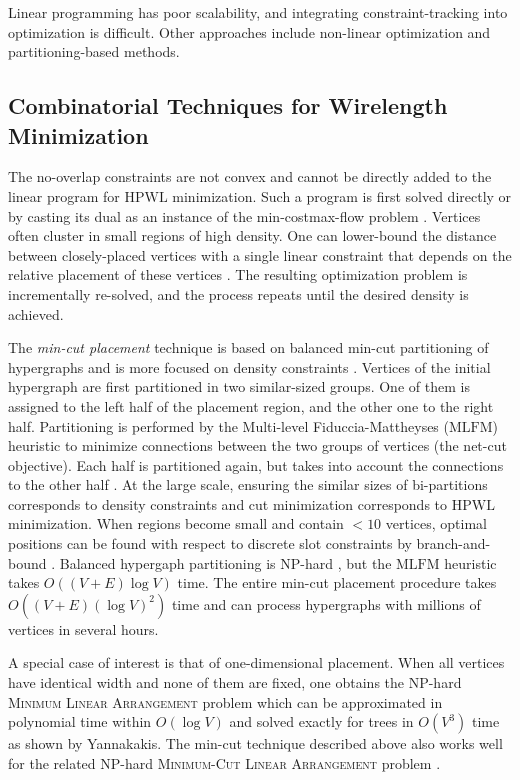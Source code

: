 \documentclass[natbib]{svcyclop}
\begin{document}
Linear programming has poor scalability, and integrating
constraint-tracking into optimization is difficult.
Other approaches include non-linear optimization and
partitioning-based methods.

\subsection{Combinatorial Techniques
for Wirelength Minimization}
The no-overlap constraints are not convex and cannot be
directly added to the linear program for $\mathrm{HPWL}$ minimization.
Such a program is first solved directly or by casting its
dual as an instance of the min-costmax-flow problem \cite{TanTiaWon05}.
Vertices often cluster in small regions of high density. One
can lower-bound the distance between closely-placed vertices
with a single linear constraint that depends on the relative
placement of these vertices \cite{RedCho06}. The resulting optimization
problem is incrementally re-solved, and the process
repeats until the desired density is achieved.

The \emph{min-cut placement} technique is based on balanced
min-cut partitioning of hypergraphs and is more focused
on density constraints \cite{RoyAdyPapMar06}. Vertices of the initial hypergraph
are first partitioned in two similar-sized groups. One
of them is assigned to the left half of the placement region,
and the other one to the right half. Partitioning is performed
by the Multi-level Fiduccia-Mattheyses ($\mathrm{MLFM}$)
heuristic \cite{PapMar07} to minimize connections between the two
groups of vertices (the net-cut objective). Each half is partitioned
again, but takes into account the connections to
the other half \cite{RoyAdyPapMar06}. At the large scale, ensuring the similar
sizes of bi-partitions corresponds to density constraints
and cut minimization corresponds to $\mathrm{HPWL}$ minimization.
When regions become small and contain $< 10$ vertices,
optimal positions can be found with respect to discrete
slot constraints by branch-and-bound \cite{CalKahMar00}. Balanced
hypergaph partitioning is NP-hard \cite{CGKMSP98}, but the $\mathrm{MLFM}$
heuristic takes $O((V + E)\log V)$ time. The entire min-cut
placement procedure takes $O((V + E)(\log V)^2)$ time and
can process hypergraphs with millions of vertices in several
hours.

A special case of interest is that of one-dimensional
placement. When all vertices have identical width and
none of them are fixed, one obtains the NP-hard \textsc{Minimum
Linear Arrangement} problem \cite{CGKMSP98} which can
be approximated in polynomial time within $O(\log V)$
and solved exactly for trees in $O(V^3)$ time as shown by
Yannakakis. The min-cut technique described above also
works well for the related NP-hard \textsc{Minimum-Cut
Linear Arrangement} problem \cite{CGKMSP98}.
\end{document}
